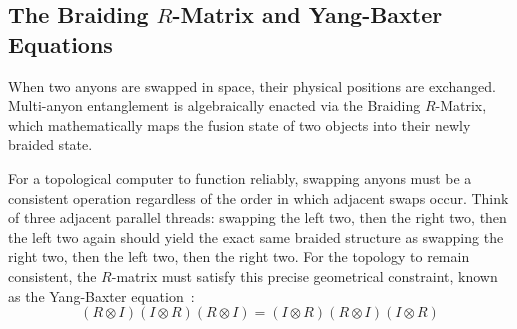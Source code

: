 \subsection{The Braiding \texorpdfstring{$R$}{R}-Matrix and Yang-Baxter Equations}
When two anyons are swapped in space, their physical positions are exchanged. Multi-anyon entanglement is algebraically enacted via the Braiding $R$-Matrix, which mathematically maps the fusion state of two objects into their newly braided state. 

For a topological computer to function reliably, swapping anyons must be a consistent operation regardless of the order in which adjacent swaps occur. Think of three adjacent parallel threads: swapping the left two, then the right two, then the left two again should yield the exact same braided structure as swapping the right two, then the left two, then the right two. For the topology to remain consistent, the $R$-matrix must satisfy this precise geometrical constraint, known as the Yang-Baxter equation~\cite{jimbo1989}:
\begin{equation}
    (R \otimes I)(I \otimes R)(R \otimes I) = (I \otimes R)(R \otimes I)(I \otimes R)
\end{equation}

